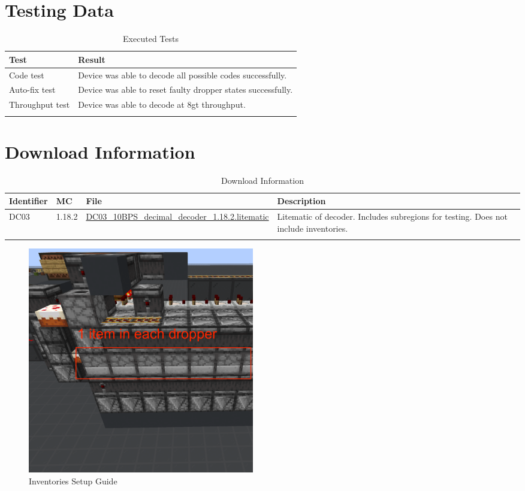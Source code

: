 \documentclass[10pt]{datasheet}
\begin{document}
\section{Testing Data}
\begin{table}[h]
\caption{Executed Tests}
\begin{tabularx}{\textwidth}{l | X}
    \thickhline
    \textbf{Test} & \textbf{Result} \\
    \hline
    Code test & Device was able to decode all possible codes successfully.\\
    \hline
    Auto-fix test & Device was able to reset faulty dropper states successfully.\\
    \hline
    Throughput test & Device was able to decode at 8gt throughput.\\
    \thickhline
\end{tabularx}
\end{table}

\section{Download Information}
\begin{table}[h]
    \caption{Download Information}
    \begin{tabularx}{\textwidth}{l | l | l | X}
        \thickhline
        \textbf{Identifier} & \textbf{MC} & \textbf{File} & \textbf{Description} \\
        \hline
        DC03 & 1.18.2 & \href{https://github.com/Soontech-Annals/Archive/blob/b56572c0d2b4f182d9e9d41449d8cb2963b923ae/Archive/decoders/DC03\%2010BPS\%202\%20Digit\%20Decimal\%20Decoder/DC03\_10BPS\_decimal\_decoder\_1.18.2.litematic?raw=1}{DC03\_10BPS\_decimal\_decoder\_1.18.2.litematic} & Litematic of decoder. Includes subregions for testing. Does not include inventories. \\
        \hline
        \thickhline
    \end{tabularx}
\end{table}

\begin{figure}[h]
    \includegraphics[width=0.48\textwidth]{inv.png}
    \caption{Inventories Setup Guide}
\end{figure}
\end{document}
